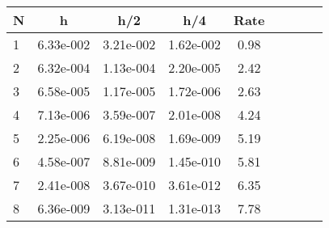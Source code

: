 \begin{tabular}{lcccccccc}
N & h & h/2 & h/4 & Rate\\
\hline
1& 6.33e-002& 3.21e-002& 1.62e-002& 0.98\\
2& 6.32e-004& 1.13e-004& 2.20e-005& 2.42\\
3& 6.58e-005& 1.17e-005& 1.72e-006& 2.63\\
4& 7.13e-006& 3.59e-007& 2.01e-008& 4.24\\
5& 2.25e-006& 6.19e-008& 1.69e-009& 5.19\\
6& 4.58e-007& 8.81e-009& 1.45e-010& 5.81\\
7& 2.41e-008& 3.67e-010& 3.61e-012& 6.35\\
8& 6.36e-009& 3.13e-011& 1.31e-013& 7.78\\
\hline
\end{tabular}
